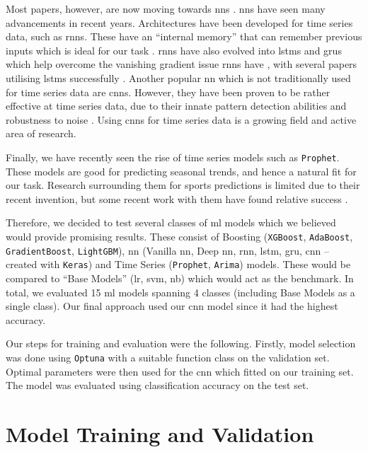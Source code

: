 \documentclass{article}
\newcommand{\sw}[1]{\texttt{#1}}
\begin{document}
Most papers, however, are now moving towards \gls{nn}s \cite{horvat2020use}. \gls{nn}s have seen many advancements in recent years. Architectures have been developed for time series data, such as \gls{rnn}s. These have an “internal memory” that can remember previous inputs which is ideal for our task \cite{dongesbuiltinRNN}. \gls{rnn}s have also evolved into \gls{lstm}s and \gls{gru}s which help overcome the vanishing gradient issue \gls{rnn}s have \cite{dongesbuiltinRNN}, with several papers utilising \gls{lstm}s successfully \cite{goddijn2018surebet, jain2021soccer}. Another popular \gls{nn} which is not traditionally used for time series data are \gls{cnn}s. However, they have been proven to be rather effective at time series data, due to their innate pattern detection abilities and robustness to noise \cite{brownleemediumconvolutional}. Using \gls{cnn}s for time series data is a growing field and active area of research. 

Finally, we have recently seen the rise of time series models such as \sw{Prophet}. These models are good for predicting seasonal trends, and hence a natural fit for our task. Research surrounding them for sports predictions is limited due to their recent invention, but some recent work with them have found relative success \cite{nandakumarmediumforecasting}. 

Therefore, we decided to test several classes of \gls{ml} models which we believed would provide promising results. These consist of Boosting (\sw{XGBoost}, \sw{AdaBoost}, \sw{GradientBoost}, \sw{LightGBM}), \gls{nn} (Vanilla \gls{nn}, Deep \gls{nn}, \gls{rnn}, \gls{lstm}, \gls{gru}, \gls{cnn} – created with \sw{Keras}) and Time Series (\sw{Prophet}, \sw{Arima}) models. These would be compared to “Base Models” (\gls{lr}, \gls{svm}, \gls{nb}) which would act as the benchmark. In total, we evaluated 15 \gls{ml} models spanning 4 classes (including Base Models as a single class). Our final approach used our \gls{cnn} model since it had the highest accuracy.

Our steps for training and evaluation were the following. Firstly, model selection was done using \sw{Optuna} with a suitable function class on the validation set. Optimal parameters were then used for the \gls{cnn} which fitted on our training set. The model was evaluated using classification accuracy on the test set. 

\section{Model Training and Validation}
\label{model}
\end{document}
